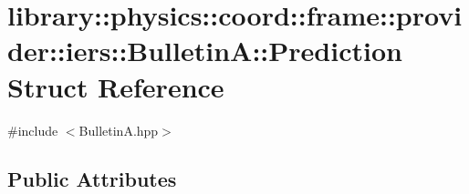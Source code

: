 \hypertarget{structlibrary_1_1physics_1_1coord_1_1frame_1_1provider_1_1iers_1_1_bulletin_a_1_1_prediction}{}\section{library\+:\+:physics\+:\+:coord\+:\+:frame\+:\+:provider\+:\+:iers\+:\+:BulletinA\+:\+:Prediction Struct Reference}
\label{structlibrary_1_1physics_1_1coord_1_1frame_1_1provider_1_1iers_1_1_bulletin_a_1_1_prediction}


{\ttfamily \#include $<$Bulletin\+A.\+hpp$>$}

\subsection*{Public Attributes}
